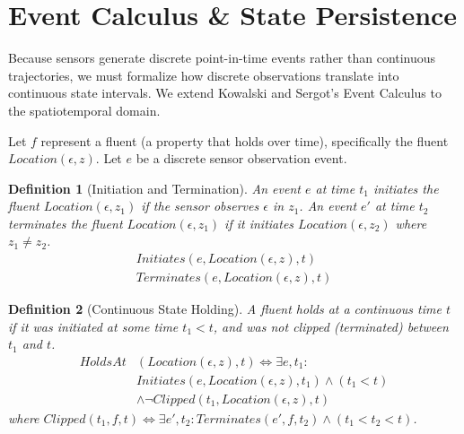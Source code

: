 \documentclass[conference]{IEEEtran}
\newtheorem{definition}{Definition}
\begin{document}
\section{Event Calculus \& State Persistence}

Because sensors generate discrete point-in-time events rather than continuous trajectories, we must formalize how discrete observations translate into continuous state intervals. We extend Kowalski and Sergot's Event Calculus \cite{b2} to the spatiotemporal domain.

Let $f$ represent a fluent (a property that holds over time), specifically the fluent $Location(\epsilon, z)$. Let $e$ be a discrete sensor observation event.

\begin{definition}[Initiation and Termination]
An event $e$ at time $t_1$ \textit{initiates} the fluent $Location(\epsilon, z_1)$ if the sensor observes $\epsilon$ in $z_1$. An event $e'$ at time $t_2$ \textit{terminates} the fluent $Location(\epsilon, z_1)$ if it initiates $Location(\epsilon, z_2)$ where $z_1 \neq z_2$.
\begin{align}
Initiates(e, Location(\epsilon, z), t) \\
Terminates(e, Location(\epsilon, z), t) 
\end{align}
\end{definition}

\begin{definition}[Continuous State Holding]
A fluent holds at a continuous time $t$ if it was initiated at some time $t_1 < t$, and was not clipped (terminated) between $t_1$ and $t$.
\begin{equation}
\begin{aligned}
HoldsAt&(Location(\epsilon, z), t) \iff \exists e, t_1 : \\
& Initiates(e, Location(\epsilon, z), t_1) \land (t_1 < t) \\
& \land \neg Clipped(t_1, Location(\epsilon, z), t)
\end{aligned}
\end{equation}
where $Clipped(t_1, f, t) \iff \exists e', t_2 : Terminates(e', f, t_2) \land (t_1 < t_2 < t)$.
\end{definition}
\end{document}
